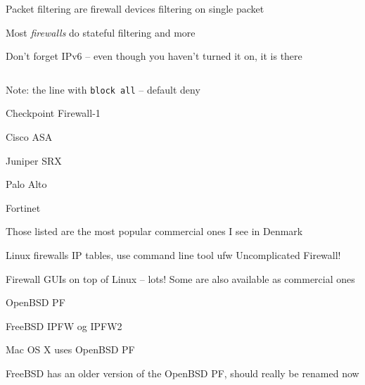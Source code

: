 \documentclass[Screen16to9,17pt]{foils}
\begin{document}
\begin{list1}
\item Packet filtering are firewall devices filtering on single packet
\item Most \emph{firewalls} do stateful filtering and more
\item Don't forget IPv6 -- even though you haven't turned it on, it is there
\end{list1}



\begin{figure}[H]\tiny
\inputminted{shell}{policies/gateway-config-simple.conf}
\end{figure}

Note: the line with \verb+block all+ -- default deny

\begin{list2}
\item Checkpoint Firewall-1 
\item Cisco ASA 
\item Juniper SRX 
\item Palo Alto 
\item Fortinet 
\end{list2}

Those listed are the most popular commercial ones I see in Denmark


\begin{list2}
\item Linux firewalls IP tables, use command line tool ufw Uncomplicated Firewall!
\item Firewall GUIs on top of Linux -- lots! Some are also available as commercial ones
\item OpenBSD PF
\item FreeBSD IPFW og IPFW2 
\item Mac OS X uses OpenBSD PF
\item FreeBSD has an older version of the OpenBSD PF, should really be renamed now
\end{list2}
\end{document}
